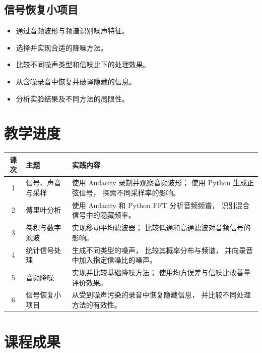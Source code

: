 \documentclass[12pt,fontset=none]{ctexart}
\begin{document}
\subsection{信号恢复小项目}

\begin{itemize}
  \item 通过音频波形与频谱识别噪声特征。
  \item 选择并实现合适的降噪方法。
  \item 比较不同噪声类型和信噪比下的处理效果。
  \item 从含噪录音中恢复并破译隐藏的信息。
  \item 分析实验结果及不同方法的局限性。
\end{itemize}

\section{教学进度}

\begin{center}
\small
\begin{tabular}{@{}c p{3.5cm} p{11.3cm}@{}}
\toprule
课次 & 主题 & 实践内容 \\
\midrule

1 & 信号、声音与采样
  & 使用 Audacity 录制并观察音频波形；
    使用 Python 生成正弦信号，
    探索不同采样率的影响。 \\

2 & 傅里叶分析
  & 使用 Audacity 和 Python FFT 分析音频频谱，
    识别混合信号中的隐藏频率。 \\

3 & 卷积与数字滤波
  & 实现移动平均滤波器；
    比较低通和高通滤波对音频信号的影响。 \\

4 & 统计信号处理
  & 生成不同类型的噪声，
    比较其概率分布与频谱，
    并向录音中加入指定信噪比的噪声。 \\

5 & 音频降噪
  & 实现并比较基础降噪方法；
    使用均方误差与信噪比改善量评价效果。 \\

6 & 信号恢复小项目
  & 从受到噪声污染的录音中恢复隐藏信息，
    并比较不同处理方法的有效性。 \\

\bottomrule
\end{tabular}
\end{center}

\section{课程成果}
\end{document}
